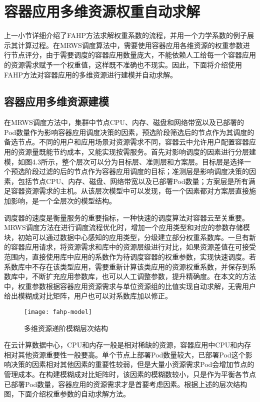 \section{容器应用多维资源权重自动求解}
上一小节详细介绍了FAHP方法求解权重系数的流程，并用一个力学系数的例子展示其计算过程。在MRWS调度算法中，需要使用容器应用各维资源的权重参数进行节点评分，由于需要调度的容器应用数量庞大，不能依赖人工给每一个容器应用的资源需求赋予一个权重值，这样既不准确也不现实。因此，下面将介绍使用FAHP方法对容器应用的多维资源进行建模并自动求解。
\subsection{容器应用多维资源建模}
在MRWS调度方法中，集群中节点CPU、内存、磁盘和网络带宽以及已部署的Pod数量作为影响容器应用调度决策的因素，预选阶段筛选后的节点作为其调度的备选节点。不同的用户和应用场景对资源需求不同，容器云中允许用户配置容器应用的资源量既能节约成本，又能实现按需服务。首先对影响调度的因素进行分层建模，如图4.3所示，整个层次可以分为目标层、准则层和方案层。目标层是选择一个预选阶段过滤的后的节点作为容器应用调度的目标；准测层是影响调度决策的因素，包括节点CPU、内存、磁盘、网络带宽以及已部署Pod数量；方案层是所有满足容器资源需求的主机。从该层次模型中可以发现，每一个因素都对方案层直接施加影响，是一个全层次的模型结构。

调度器的速度是衡量服务的重要指标，一种快速的调度算法对容器云至关重要。MRWS调度方法在进行调度流程优化时，增加一个应用类型和对应的参数存储模块，初始可以通过数据中心感知的应用类型，分级建立部分权重系数库。一旦有新的容器应用请求，将资源需求和库中的资源层级进行对比，如果资源差值在可接受范围内，直接使用库中应用的系数作为待调度容器的权重参数，实现快速调度。若系数库中不存在该类型应用，需要重新计算该类应用的资源权重系数，并保存到系数库中，不断扩充应用参数库，也可以人工调整参数，提升精确度。在本文的方法中，权重参数根据容器应用资源需求与单位资源组的比值实现自动求解，无需用户给出模糊成对比矩阵，用户也可以对系数库加以修正。
\begin{figure}[H] %
	\centering
	\texttt{[image: fahp-model]}
	\caption{多维资源递阶模糊层次结构}
\end{figure}
在云计算数据中心，CPU和内存一般是相对稀缺的资源，容器应用中CPU和内存相对其他资源重要性一般要高。单个节点上部署Pod数量较大，已部署Pod这个影响决策的因素相对其他因素的重要性较弱，但是大量小资源需求Pod会增加节点的管理成本。在构建模糊成对比矩阵时，该因素的模糊数较小，只是作为平衡各节点已部署Pod数量，容器应用的资源需求才是首要考虑因素。根据上述的层次结构图，下面介绍权重参数的自动求解方法。

